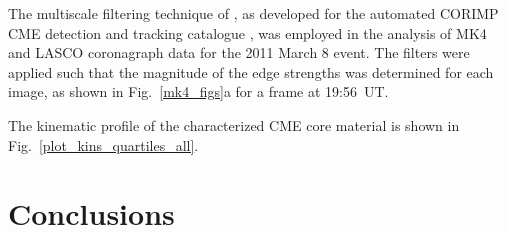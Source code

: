 \documentclass[preprint2]{aastex}
\begin{document}


The multiscale filtering technique of \citet{2008SoPh..248..457Y}, as developed for the automated CORIMP CME detection and tracking catalogue \citep{2012ApJ...752..145B}, was employed in the analysis of MK4 and LASCO coronagraph data for the 2011 March 8 event. The filters were applied such that the magnitude of the edge strengths was determined for each image, as shown in Fig.~\ref{mk4_figs}a for a frame at 19:56~UT. 

The kinematic profile of the characterized CME core material is shown in Fig.~\ref{plot_kins_quartiles_all}.


\section{Conclusions}


\end{document}
